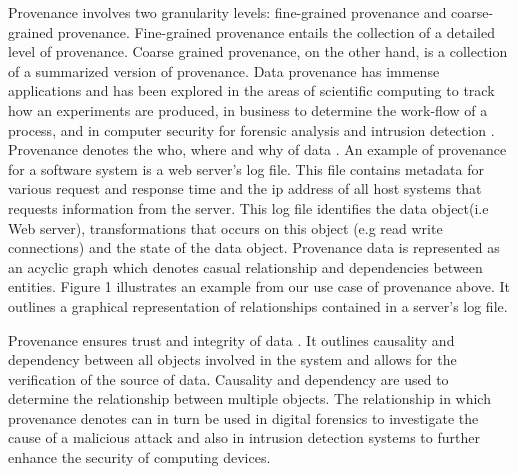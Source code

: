 Provenance involves two granularity levels: fine-grained provenance and coarse-grained provenance. Fine-grained provenance \cite{glavic_case_2011} entails the collection of a detailed level of provenance. Coarse grained provenance, on the other hand, is a collection of a summarized version of provenance. Data provenance has immense applications and has been explored in the areas of scientific computing \cite{groth, altintas} to track how an experiments are produced, in business to determine the work-flow of  a process, and in computer security for forensic analysis and intrusion detection \cite{bates_towards_2013, muniswamy_reddy_provenance_2010, muniswamy_reddy} . Provenance denotes the who, where and why of data \cite{cheney_provenance_2009}. An example of provenance for a software system is a web server's log file. This file contains metadata for various request and response time and the ip address of all host systems that requests information from the server. This log file identifies the data object(i.e Web server), transformations that occurs on this object (e.g read write connections) and the state of the data object. Provenance data is represented as an acyclic graph which denotes casual relationship and dependencies between entities. Figure 1 illustrates an example from our use case of provenance above. It outlines a graphical representation of relationships contained in a server's log file.




\par Provenance ensures trust and integrity of data \cite{Bertino2015}. It outlines causality and dependency between all objects involved in the system and allows for the verification of the source of data. Causality and dependency are used to determine the relationship between multiple objects. The relationship in which provenance denotes can in turn be used in digital forensics \cite{zawoadfecloud} to investigate the cause of a malicious attack and also in intrusion detection systems to further enhance the security of computing devices. 
 



%
%




